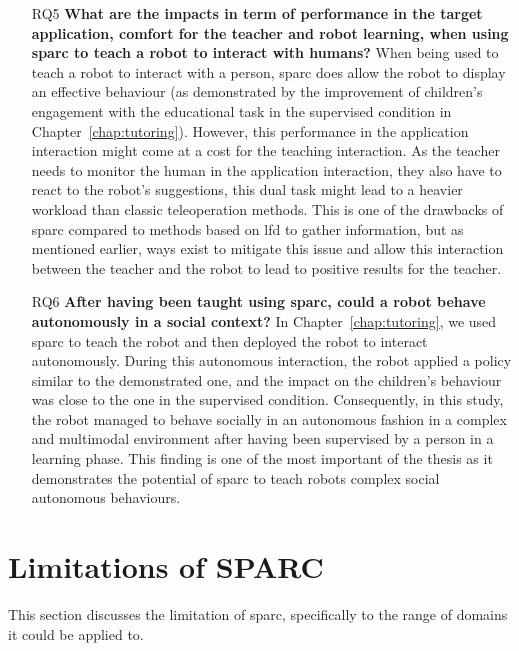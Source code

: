 \begin{itemize}
	\item [RQ5] \textbf{What are the impacts in term of performance in the target application, comfort for the teacher and robot learning, when using \gls{sparc} to teach a robot to interact with humans?}
	When being used to teach a robot to interact with a person, \gls{sparc} does allow the robot to display an effective behaviour (as demonstrated by the improvement of children's engagement with the educational task in the supervised condition in Chapter~\ref{chap:tutoring}). However, this performance in the application interaction might come at a cost for the teaching interaction. As the teacher needs to monitor the human in the application interaction, they also have to react to the robot's suggestions, this dual task might lead to a heavier workload than classic teleoperation methods. This is one of the drawbacks of \gls{sparc} compared to methods based on \gls{lfd} to gather information, but as mentioned earlier, ways exist to mitigate this issue and allow this interaction between the teacher and the robot to lead to positive results for the teacher.
	
	\item [RQ6] \textbf{After having been taught using \gls{sparc}, could a robot behave autonomously in a social context?}
	In Chapter~\ref{chap:tutoring}, we used \gls{sparc} to teach the robot and then deployed the robot to interact autonomously. During this autonomous interaction, the robot applied a policy similar to the demonstrated one, and the impact on the children's behaviour was close to the one in the supervised condition. Consequently, in this study, the robot managed to behave socially in an autonomous fashion in a complex and multimodal environment after having been supervised by a person in a learning phase. This finding is one of the most important of the thesis as it demonstrates the potential of \gls{sparc} to teach robots complex social autonomous behaviours.
\end{itemize}

\section{Limitations of SPARC} \label{sec:disc_limitations}

This section discusses the limitation of \gls{sparc}, specifically to the range of domains it could be applied to.


